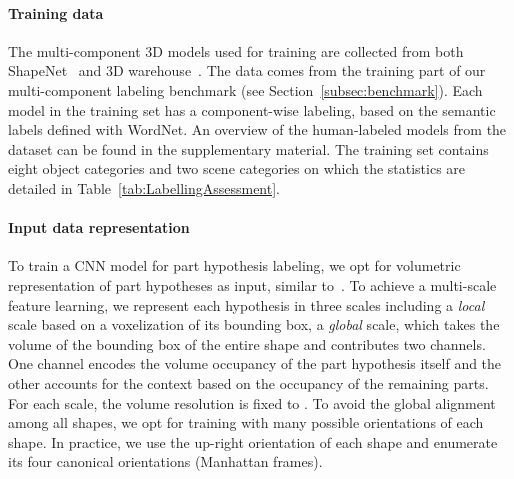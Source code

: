 \documentclass[acmtog]{acmart}
\newcommand{\kx}[1]{{\color{black}#1}}
\newcommand{\wang}[1]{{\color{black}#1}}
\begin{document}
\paragraph{\textbf{Training data}}
The multi-component 3D models used for training are collected from both ShapeNet~\cite{ShapeNet2015} and 3D warehouse~\cite{Tri3Dwarehouse}.
The data comes from the training part of our multi-component labeling benchmark (see Section~\ref{subsec:benchmark}).
Each model in the training set has a component-wise labeling, based on the semantic labels defined
with WordNet. \kx{An overview of the human-labeled models from the dataset can be found in the supplementary material.}
The training set contains eight object categories and two scene categories on which the statistics are detailed in Table~\ref{tab:LabellingAssessment}.









\paragraph{\textbf{Input data representation}}
To train a CNN model for part hypothesis labeling,
we opt for volumetric representation of part hypotheses as input, similar to~\cite{Wu_CVPR15}.
To achieve a multi-scale feature learning,
we represent each hypothesis in three scales including
a \emph{local} scale based on a voxelization of its bounding box,
a \emph{global} scale, which takes the volume of the bounding box of the entire shape and
contributes two channels.
One channel encodes the volume occupancy of the part hypothesis itself
and the other accounts for the context based on the occupancy of the remaining parts.
For each scale, the volume resolution is fixed to .
\wang{
To avoid the global alignment among all shapes, we opt for training with many possible orientations of each shape. In practice, we use the up-right orientation of each shape and enumerate its four canonical orientations (Manhattan frames).
}
\end{document}
